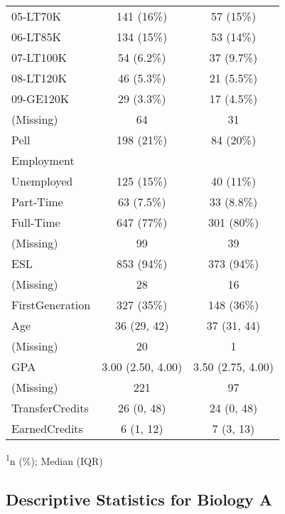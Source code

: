 \begin{appendix}
\begin{longtable}{lcc}
05-LT70K & 141 (16\%) & 57 (15\%) \\ 
06-LT85K & 134 (15\%) & 53 (14\%) \\ 
07-LT100K & 54 (6.2\%) & 37 (9.7\%) \\ 
08-LT120K & 46 (5.3\%) & 21 (5.5\%) \\ 
09-GE120K & 29 (3.3\%) & 17 (4.5\%) \\ 
(Missing) & 64 & 31 \\ 
Pell & 198 (21\%) & 84 (20\%) \\ 
Employment &  &  \\ 
Unemployed & 125 (15\%) & 40 (11\%) \\ 
Part-Time & 63 (7.5\%) & 33 (8.8\%) \\ 
Full-Time & 647 (77\%) & 301 (80\%) \\ 
(Missing) & 99 & 39 \\ 
ESL & 853 (94\%) & 373 (94\%) \\ 
(Missing) & 28 & 16 \\ 
FirstGeneration & 327 (35\%) & 148 (36\%) \\ 
Age & 36 (29, 42) & 37 (31, 44) \\ 
(Missing) & 20 & 1 \\ 
GPA & 3.00 (2.50, 4.00) & 3.50 (2.75, 4.00) \\ 
(Missing) & 221 & 97 \\ 
TransferCredits & 26 (0, 48) & 24 (0, 48) \\ 
EarnedCredits & 6 (1, 12) & 7 (3, 13) \\ 
\bottomrule
\end{longtable}
\begin{minipage}{\linewidth}
\textsuperscript{1}n (\%); Median (IQR)\\
\end{minipage}

\clearpage

\hypertarget{descriptive-statistics-for-biology-a}{%
\subsection{Descriptive Statistics for Biology
A}\label{descriptive-statistics-for-biology-a}}


\end{appendix}
